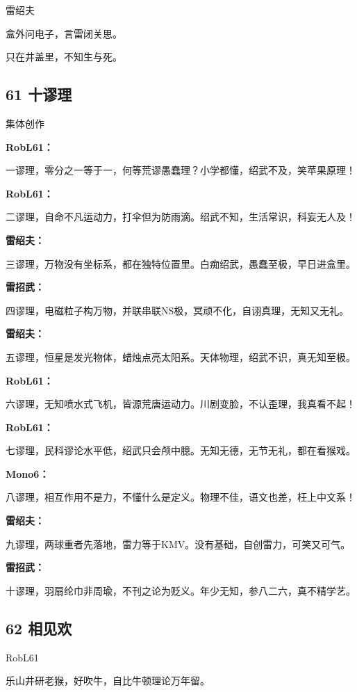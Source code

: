 雷绍夫

盒外问电子，言雷闭关思。

只在井盖里，不知生与死。

\hypertarget{ux5341ux8c2cux7406}{%
\subsection{61 十谬理}\label{ux5341ux8c2cux7406}}

集体创作

\textbf{RobL61：}

一谬理，零分之一等于一，何等荒谬愚蠢理？小学都懂，绍武不及，笑苹果原理！

\textbf{RobL61：}

二谬理，自命不凡运动力，打伞但为防雨滴。绍武不知，生活常识，科妄无人及！

\textbf{雷绍夫：}

三谬理，万物没有坐标系，都在独特位置里。白痴绍武，愚蠢至极，早日进盒里。

\textbf{雷招武：}

四谬理，电磁粒子构万物，并联串联NS极，冥顽不化，自诩真理，无知又无礼。

\textbf{雷绍夫：}

五谬理，恒星是发光物体，蜡烛点亮太阳系。天体物理，绍武不识，真无知至极。

\textbf{RobL61：}

六谬理，无知喷水式飞机，皆源荒唐运动力。川剧变脸，不认歪理，我真看不起！

\textbf{RobL61：}

七谬理，民科谬论水平低，绍武只会颅中臆。无知无德，无节无礼，都在看猴戏。

\textbf{Mono6：}

八谬理，相互作用不是力，不懂什么是定义。物理不佳，语文也差，枉上中文系！

\textbf{雷绍夫：}

九谬理，两球重者先落地，雷力等于KMV。没有基础，自创雷力，可笑又可气。

\textbf{雷招武：}

十谬理，羽扇纶巾非周瑜，不刊之论为贬义。年少无知，参八二六，真不精学艺。

\hypertarget{ux76f8ux89c1ux6b22}{%
\subsection{62 相见欢}\label{ux76f8ux89c1ux6b22}}

RobL61

乐山井研老猴，好吹牛，自比牛顿理论万年留。

